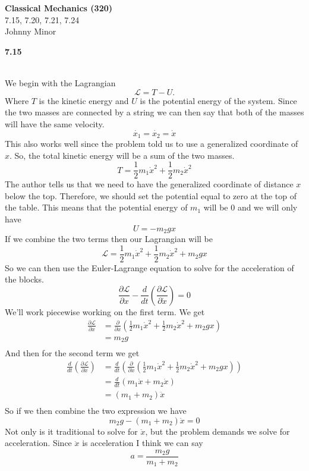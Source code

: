 \documentclass[11pt, leqno]{article}
\begin{document}
{\centering
\textbf{Classical Mechanics (320)} \\  
7.15, 7.20, 7.21, 7.24 \\
Johnny Minor \\
}

\noindent \textbf{7.15}

{\centering
\fbox{ 
\begin{minipage}{4in} 
\hfill\vspace{2in} 
\end{minipage} } \\
}
\bigskip
We begin with the Lagrangian
$$
\mathcal{L} = T - U.
$$
Where $T$ is the kinetic energy and $U$ is the potential energy of the system. 
Since the two masses are connected by a string we can then say that both of the masses will have the same velocity. 
$$
\dot{x_1} = \dot{x_2} = \dot{x}
$$
This also works well since the problem told us to use a generalized coordinate of $x$. So, the total kinetic energy will be a sum of the two masses. 
$$ 
T = \frac{1}{2}m_1\dot{x}^2+\frac{1}{2}m_2\dot{x}^2
$$
The author tells us that we need to have the generalized coordinate of distance $x$ below the top. Therefore, we should set the potential equal to zero at the top of the table. This means that the potential energy of $m_1$ will be 0 and we will only have 
$$
U = -m_2 g x
$$
If we combine the two terms then our Lagrangian will be 
$$
\mathcal{L} = \frac{1}{2}m_1\dot{x}^2+\frac{1}{2}m_2\dot{x}^2 + m_2 g x 
$$
So we can then use the Euler-Lagrange equation to solve for the acceleration of the blocks. 
$$
\frac{\partial \mathcal{L}}{\partial x} - \frac{d}{dt}\left(\frac{\partial \mathcal{L}}{\partial \dot{x}}\right)= 0 
$$
We'll work piecewise working on the first term. We get 
\begin{align*}
\frac{\partial \mathcal{L}}{\partial x} &= \frac{\partial}{\partial x}\left(\frac{1}{2}m_1\dot{x}^2+\frac{1}{2}m_2\dot{x}^2 + m_2 g x \right) \\ 
&= m_2 g \\
\end{align*}
And then for the second term we get 
\begin{align*}
\frac{d}{dt}\left(\frac{\partial \mathcal{L}}{\partial \dot{x}}\right) &= \frac{d}{dt}\left( \frac{\partial}{\partial \dot{x}}\left(\frac{1}{2}m_1\dot{x}^2+\frac{1}{2}m_2\dot{x}^2 + m_2 g x \right) \right) \\
&=  \frac{d}{dt}\left( m_1 \dot{x} + m_2 \dot{x} \right) \\ 
&= (m_1 + m_2)\ddot{x}\\
\end{align*}
So if we then combine the two expression we have 
$$
m_2 g - (m_1 + m_2)\ddot{x} = 0 
$$
Not only is it traditional to solve for $\ddot{x}$, but the problem demands we solve for acceleration. Since $\ddot{x}$ is acceleration I think we can say
$$
\boxed{a = \frac{m_2 g}{m_1 + m_2}}
$$
\end{document}
